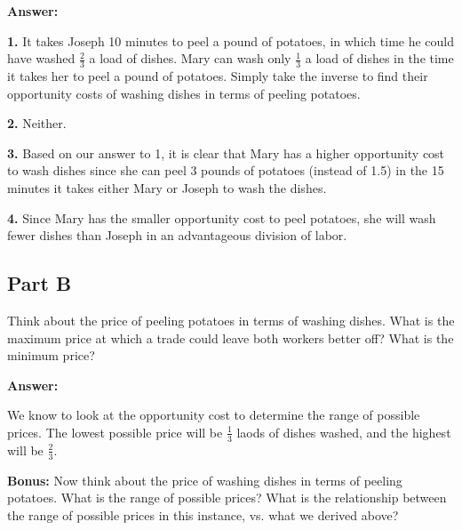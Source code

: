 \documentclass[12pt]{article}
\begin{document}
\textbf{Answer:}

\medskip

\textbf{1.} It takes Joseph 10 minutes to peel a pound of potatoes, in which time he could have washed $\frac{2}{3}$ a load of dishes. Mary can wash only $\frac{1}{3}$ a load of dishes in the time it takes her to peel a pound of potatoes. Simply take the inverse to find their opportunity costs of washing dishes in terms of peeling potatoes.

\medskip

\textbf{2.} Neither.

\medskip

\textbf{3.} Based on our answer to 1, it is clear that Mary has a higher opportunity cost to wash dishes since she can peel 3 pounds of potatoes (instead of 1.5) in the 15 minutes it takes either Mary or Joseph to wash the dishes.

\medskip

\textbf{4.} Since Mary has the smaller opportunity cost to peel potatoes, she will wash fewer dishes than Joseph in an advantageous division of labor.

\subsection*{Part B}
Think about the price of peeling potatoes in terms of washing dishes. What is the maximum price at which a trade could leave both workers better off? What is the minimum price?

\medskip

\textbf{Answer:}

We know to look at the opportunity cost to determine the range of possible prices. The lowest possible price will be $\frac{1}{3}$ laods of dishes washed, and the highest will be $\frac{2}{3}$.

\medskip

\textbf{Bonus:} Now think about the price of washing dishes in terms of peeling potatoes. What is the range of possible prices? What is the relationship between the range of possible prices in this instance, vs. what we derived above?
\end{document}
